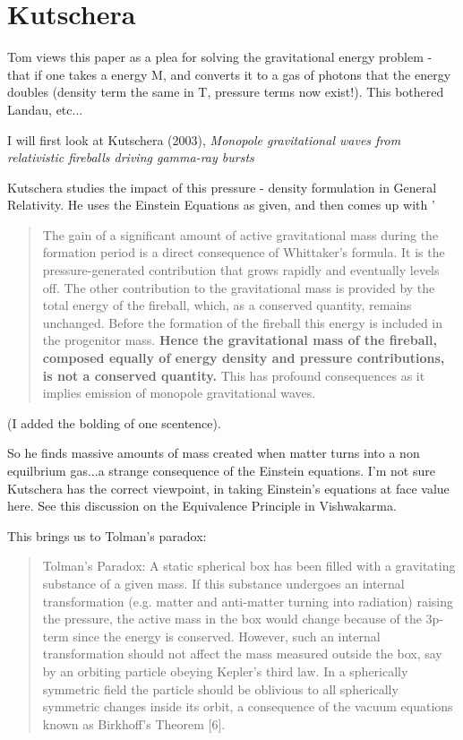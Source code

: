 \documentclass[../rzero]{subfiles}
\begin{document}
\section{Kutschera}
Tom views this paper as a plea for solving the gravitational energy problem - that if one takes a energy M, and converts it to a gas of photons that the energy doubles (density term the same in T, pressure terms now exist!). This bothered Landau, etc... 

 

I will first look at Kutschera (2003)\cite{Kutschera2003}, \textit{Monopole gravitational waves from relativistic fireballs driving gamma-ray bursts}

Kutschera studies the impact of this pressure - density formulation in General Relativity. He uses the Einstein Equations as given, and then comes up with '
\begin{quotation}
		The gain of a significant amount of active gravitational mass during the formation period is a direct consequence of Whittaker's formula. It is the pressure-generated contribution that grows rapidly and eventually levels off. The other contribution to the gravitational mass is provided by the total energy of the fireball, which, as a conserved quantity, remains unchanged. Before the formation of the fireball this energy is included in the progenitor mass. \textbf{Hence the gravitational mass of the fireball, composed equally of energy density and pressure contributions, is not a conserved quantity.} This has profound consequences as it implies emission of monopole gravitational waves.
\end{quotation} (I added the bolding of one scentence).

So he finds massive amounts of mass created when matter turns into a non equilbrium gas...a strange consequence of the Einstein equations. I'm not sure Kutschera has the correct viewpoint, in taking Einstein's equations at face value here. See this discussion on the Equivalence Principle in Vishwakarma\cite{vishwakarmaEinsteinCriticalPerspective2016}.

This brings us to Tolman's paradox:
\begin{quotation}
	Tolman’s Paradox: A static spherical box has been filled with a gravitating substance of a given mass. If this substance undergoes an internal transformation (e.g. matter and anti-matter turning into radiation) raising the pressure, the active mass in the box would change because of the 3p-term since the energy is conserved. However, such an internal transformation should not affect the mass measured outside the box, say by an orbiting particle obeying Kepler’s third law. In a spherically symmetric field the particle should be oblivious to all spherically symmetric changes inside its orbit, a consequence of the vacuum equations known as Birkhoff’s Theorem [6].
\end{quotation}
\end{document}
